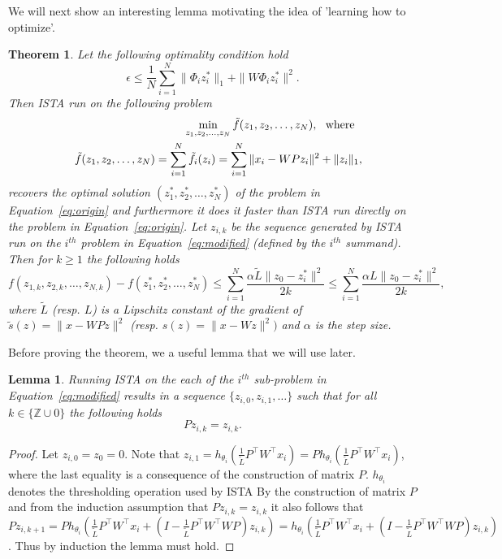 \documentclass{article} %
\newtheorem{theorem}{Theorem}[section]
\newtheorem{lemma}{Lemma}[section]
\begin{document}
We will next show an interesting lemma motivating the idea of 'learning how to optimize'. 
\begin{theorem}
Let the following optimality condition hold
\[\epsilon \leq \frac{1}{N}\sum_{i=1}^N\|\Phi_i z^{*}_i\|_1 + \|W\Phi_i z^{*}_i\|^2.
\]
Then ISTA run on the following problem
\begin{eqnarray}
&&\min_{z_1,z_2,\dots,z_N} \tilde{f}(z_1,z_2,\dots,z_N), \text{\:\:\:where\:\:\:} \nonumber\\
&&\tilde{f}(z_1,z_2,\dots,z_N) = \sum_{i=1}^N\tilde{f}_i(z_i) = \sum_{i=1}^N\|x_i - WPz_i\|^2 + \|z_i\|_1,
\label{eq:modified}
\end{eqnarray}
recovers the optimal solution $(z^{*}_1,z^{*}_2,\dots,z^{*}_N)$ of the problem in Equation~\ref{eq:origin} and furthermore it does it faster than ISTA run directly on the problem in Equation~\ref{eq:origin}. Let $z_{i,k}$ be the sequence generated by ISTA run on the $i^{th}$ problem in Equation~\ref{eq:modified} (defined by the $i^{th}$ summand). Then for $k \geq 1$ the following holds
\begin{equation}
f(z_{1,k},z_{2,k},\dots,z_{N,k}) - f(z^{*}_1,z^{*}_2,\dots,z^{*}_N) \leq \sum_{i=1}^N\frac{\alpha\tilde{L}\|z_0 - z^{*}_i\|^2}{2k} \leq \sum_{i=1}^N\frac{\alpha L\|z_0 - z^{*}_i\|^2}{2k},
\label{eq:convrate}
\end{equation}
where $\tilde{L}$ (resp. $L$) is a Lipschitz constant of the gradient of $\tilde{s}(z) = \|x - WPz\|^2$ (resp. $s(z) = \|x - Wz\|^2)$ and $\alpha$ is the step size.
\label{thm:singlesubspace_simple}
\end{theorem}
Before proving the theorem, we a useful lemma that we will use later.
\begin{lemma}
Running ISTA on the each of the $i^{th}$ sub-problem in Equation~\ref{eq:modified} results in a sequence $\{z_{i,0},z_{i,1},\dots\}$ such that for all $k \in \{\mathbb{Z}\cup 0\}$ the following holds
\[Pz_{i,k} = z_{i,k}.
\]
\label{lem:Pzeqz}
\end{lemma}
\begin{proof}
Let $z_{i,0} = z_0 = 0$. Note that $z_{i,1} = h_{\theta_i}\left(\frac{1}{\tilde{L}}P^{\top}W^{\top}x_i\right) = Ph_{\theta_i}\left(\frac{1}{\tilde{L}}P^{\top}W^{\top}x_i\right)$, where the last equality is a consequence of the construction of matrix $P$. $h_{\theta_i}$ denotes the thresholding operation used by ISTA By the construction of matrix $P$ and from the induction assumption that $Pz_{i,k} = z_{i,k}$ it also follows that
$Pz_{i,k+1} = Ph_{\theta_i}\left(\frac{1}{\tilde{L}}P^{\top}W^{\top}x_i + \left(I - \frac{1}{\tilde{L}}P^{\top}W^{\top}WP\right)z_{i,k}\right) = h_{\theta_i}\left(\frac{1}{\tilde{L}}P^{\top}W^{\top}x_i + \left(I - \frac{1}{\tilde{L}}P^{\top}W^{\top}WP\right)z_{i,k}\right)$.
Thus by induction the lemma must hold.
\end{proof}
\end{document}
